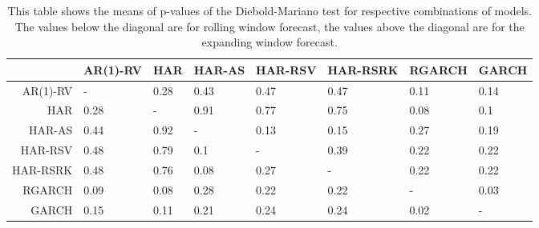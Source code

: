 \begin{table}[ht]
\centering
\begin{tabular}{rlllllll}
  \hline
 & AR(1)-RV & HAR & HAR-AS & HAR-RSV & HAR-RSRK & RGARCH & GARCH \\ 
  \hline
AR(1)-RV & - & 0.28 & 0.43 & 0.47 & 0.47 & 0.11 & 0.14 \\ 
  HAR & 0.28 & - & 0.91 & 0.77 & 0.75 & 0.08 & 0.1 \\ 
  HAR-AS & 0.44 & 0.92 & - & 0.13 & 0.15 & 0.27 & 0.19 \\ 
  HAR-RSV & 0.48 & 0.79 & 0.1 & - & 0.39 & 0.22 & 0.22 \\ 
  HAR-RSRK & 0.48 & 0.76 & 0.08 & 0.27 & - & 0.22 & 0.22 \\ 
  RGARCH & 0.09 & 0.08 & 0.28 & 0.22 & 0.22 & - & 0.03 \\ 
  GARCH & 0.15 & 0.11 & 0.21 & 0.24 & 0.24 & 0.02 & - \\ 
   \hline
\end{tabular}
\caption[DM test means]{This table shows the means of p-values of the Diebold-Mariano test for respective combinations of models.
                The values below the diagonal are for rolling window forecast, the values above the diagonal are for the expanding window forecast.} 
\label{Table:DM_test_mean}
\end{table}

